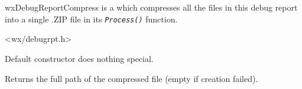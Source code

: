 
\section{}\label{wxdebugreportcompress}

wxDebugReportCompress is a  which
compresses all the files in this debug report into a single .ZIP file in its
\texttt{\textit{Process()}} function.




<wx/debugrpt.h>



\label{wxdebugreportcompresswxdebugreportcompress}


Default constructor does nothing special.

\label{wxdebugreportcompressgetcompressedfilename}


Returns the full path of the compressed file (empty if creation failed).

